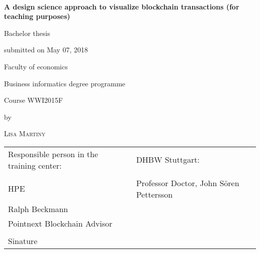 \newcommand{\typMeinerArbeit}{Bachelor thesis} 

\newcommand{\themaMeinerArbeit}{A design science approach to visualize blockchain transactions (for teaching purposes)}

\thispagestyle{empty}

\begin{spacing}{1}
\begin{center}	
~\vspace{0mm}

{\sffamily
\LARGE  
\textbf{A design science approach to visualize blockchain transactions (for teaching purposes)}

}


\vspace{15mm}

{\Large \typMeinerArbeit}

\vspace{1cm}

submitted on May 07, 2018
\vspace{15mm}
\medskip

Faculty of economics
\medskip

Business informatics degree programme
\medskip

Course WWI2015F

\vspace{10mm}

by

\vspace{10mm}

{\large\textsc{Lisa Martiny}}

\vspace{10mm}
\end{center}

\vfill

\begin{tabular}{ll}
Responsible person in the training center: & DHBW Stuttgart: \\
\hspace{0.4\linewidth} & \\
HPE & Professor Doctor, John Sören Pettersson \\
Ralph Beckmann  &  \\
Pointnext Blockchain Advisor \\
\\
Sinature \\
\end{tabular}


\vspace{1cm}
\end{spacing}

